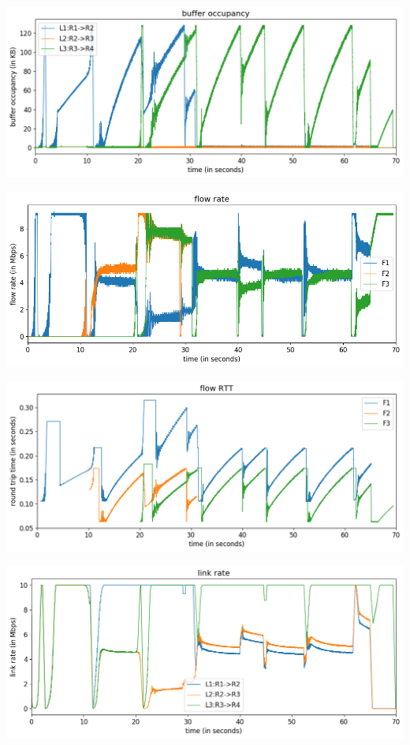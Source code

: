 \documentclass{article}
\begin{document}
\includegraphics[width = \textwidth]{"test_case2_reno buffer occupancy"}

\includegraphics[width = \textwidth]{"test_case2_reno flow rate"}

\includegraphics[width = \textwidth]{"test_case2_reno flow RTT"}

\includegraphics[width = \textwidth]{"test_case2_reno link rate"}
\end{document}
